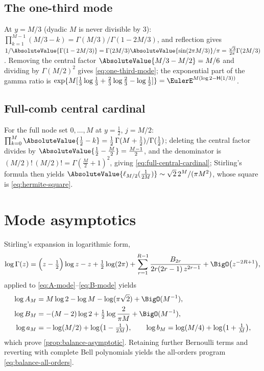 \documentclass[11pt,oneside]{article}
\numberwithin{equation}{section}
\theoremstyle{definition}
\theoremstyle{remark}
\newcommand{\Hyp}{\mathsf H}
\begin{document}
\subsection{The one-third mode}
At $y=M/3$ (dyadic $M$ is never divisible by $3$):
$\prod_{k=1}^{M-1}(M/3-k)=\Gamma(M/3)/\Gamma(1-2M/3)$, and reflection
gives $1/\AbsoluteValue{\Gamma(1-2M/3)}
=\Gamma(2M/3)\AbsoluteValue{\sin(2\pi M/3)}/\pi
=\tfrac{\sqrt3}{2\pi}\Gamma(2M/3)$.  Removing the central factor
$\AbsoluteValue{M/3-M/2}=M/6$ and dividing by $\Gamma(M/2)^{2}$ gives
\eqref{eq:one-third-mode}; the exponential part of the gamma ratio is
$\exp\{M[\tfrac13\log\tfrac13+\tfrac23\log\tfrac23-\log\tfrac12]\}
=\EulerE^{M(\log2-\Hyp(1/3))}$.

\subsection{Full-comb central cardinal}
For the full node set $0,\dots,M$ at $y=\tfrac12$, $j=M/2$:
$\prod_{k=0}^{M}\AbsoluteValue{\tfrac12-k}
=\tfrac12\,\Gamma(M+\tfrac12)/\Gamma(\tfrac12)$; deleting the
central factor divides by $\AbsoluteValue{\tfrac12-\tfrac M2}=\tfrac{M-1}2$,
and the denominator is
$(M/2)!\,(M/2)!=\Gamma(\tfrac M2+1)^{2}$, giving
\eqref{eq:full-central-cardinal}; Stirling's formula then yields
$\AbsoluteValue{\ell_{M/2}(\tfrac1{2M})}\sim\sqrt2\,2^{M}/(\pi M^{2})$, whose
square is \eqref{eq:hermite-square}.

\section{Mode asymptotics}
\label{app:mode-asymptotics}

Stirling's expansion in logarithmic form,
\begin{equation}
 \log\Gamma(z)
 =\Bigl(z-\tfrac12\Bigr)\log z-z+\tfrac12\log(2\pi)
 +\sum_{r=1}^{R-1}\frac{B_{2r}}{2r(2r-1)\,z^{2r-1}}
 +\BigO\bigl(z^{-2R+1}\bigr),
 \label{eq:stirling}
\end{equation}
applied to \eqref{eq:A-mode}--\eqref{eq:B-mode} yields
\begin{align}
 \log A_M&=M\log2-\log M-\log(\pi\sqrt2)+\BigO(M^{-1}),\\
 \log B_M&=-(M-2)\log2+\tfrac12\log\frac{2}{\pi M}+\BigO(M^{-1}),\\
 \log a_M&=-\log(M/2)+\log\bigl(1-\tfrac1{2M}\bigr),
 \qquad
 \log b_M=\log(M/4)+\log\bigl(1+\tfrac1M\bigr),
\end{align}
which prove \cref{prop:balance-asymptotic}.  Retaining further
Bernoulli terms and reverting with complete Bell polynomials yields
the all-orders program \eqref{eq:balance-all-orders}.
\end{document}
